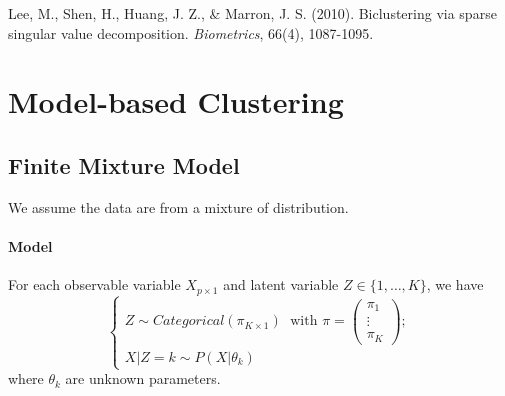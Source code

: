 \documentclass[12pt]{book}
\theoremstyle{definition}
\theoremstyle{remark}
\begin{document}
\begin{referencebox}
    Lee, M., Shen, H., Huang, J. Z., \& Marron, J. S. (2010). Biclustering via sparse singular value decomposition. \textit{Biometrics}, 66(4), 1087-1095.
\end{referencebox}

\newpage
\section{Model-based Clustering}
\subsection{Finite Mixture Model}
We assume the data are from a mixture of distribution.

\paragraph{Model}
For each observable variable $X_{p\times 1}$ and latent variable $Z \in \{1,\dots, K\}$, we have
\[\begin{cases}
    Z \sim Categorical(\pi_{K\times 1}) \;\text{ with } \pi = \begin{pmatrix}
        \pi_1\\\vdots\\\pi_K
    \end{pmatrix};\\
    X|Z = k \sim P(X|\theta_k)
\end{cases}\]
where $\theta_k$ are unknown parameters.
\end{document}
